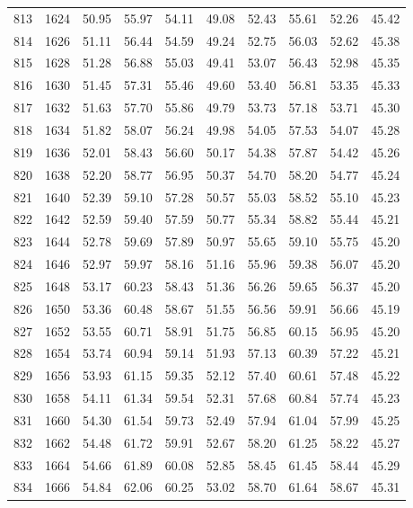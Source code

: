 \begin{longtable}{rrllllllll}
		813 & 1624 & 50.95 & 55.97 & 54.11 & 49.08 & 52.43 & 55.61 & 52.26 & 45.42 \\ 
		814 & 1626 & 51.11 & 56.44 & 54.59 & 49.24 & 52.75 & 56.03 & 52.62 & 45.38 \\ 
		815 & 1628 & 51.28 & 56.88 & 55.03 & 49.41 & 53.07 & 56.43 & 52.98 & 45.35 \\ 
		816 & 1630 & 51.45 & 57.31 & 55.46 & 49.60 & 53.40 & 56.81 & 53.35 & 45.33 \\ 
		817 & 1632 & 51.63 & 57.70 & 55.86 & 49.79 & 53.73 & 57.18 & 53.71 & 45.30 \\ 
		818 & 1634 & 51.82 & 58.07 & 56.24 & 49.98 & 54.05 & 57.53 & 54.07 & 45.28 \\ 
		819 & 1636 & 52.01 & 58.43 & 56.60 & 50.17 & 54.38 & 57.87 & 54.42 & 45.26 \\ 
		820 & 1638 & 52.20 & 58.77 & 56.95 & 50.37 & 54.70 & 58.20 & 54.77 & 45.24 \\ 
		821 & 1640 & 52.39 & 59.10 & 57.28 & 50.57 & 55.03 & 58.52 & 55.10 & 45.23 \\ 
		822 & 1642 & 52.59 & 59.40 & 57.59 & 50.77 & 55.34 & 58.82 & 55.44 & 45.21 \\ 
		823 & 1644 & 52.78 & 59.69 & 57.89 & 50.97 & 55.65 & 59.10 & 55.75 & 45.20 \\ 
		824 & 1646 & 52.97 & 59.97 & 58.16 & 51.16 & 55.96 & 59.38 & 56.07 & 45.20 \\ 
		825 & 1648 & 53.17 & 60.23 & 58.43 & 51.36 & 56.26 & 59.65 & 56.37 & 45.20 \\ 
		826 & 1650 & 53.36 & 60.48 & 58.67 & 51.55 & 56.56 & 59.91 & 56.66 & 45.19 \\ 
		827 & 1652 & 53.55 & 60.71 & 58.91 & 51.75 & 56.85 & 60.15 & 56.95 & 45.20 \\ 
		828 & 1654 & 53.74 & 60.94 & 59.14 & 51.93 & 57.13 & 60.39 & 57.22 & 45.21 \\ 
		829 & 1656 & 53.93 & 61.15 & 59.35 & 52.12 & 57.40 & 60.61 & 57.48 & 45.22 \\ 
		830 & 1658 & 54.11 & 61.34 & 59.54 & 52.31 & 57.68 & 60.84 & 57.74 & 45.23 \\ 
		831 & 1660 & 54.30 & 61.54 & 59.73 & 52.49 & 57.94 & 61.04 & 57.99 & 45.25 \\ 
		832 & 1662 & 54.48 & 61.72 & 59.91 & 52.67 & 58.20 & 61.25 & 58.22 & 45.27 \\ 
		833 & 1664 & 54.66 & 61.89 & 60.08 & 52.85 & 58.45 & 61.45 & 58.44 & 45.29 \\ 
		834 & 1666 & 54.84 & 62.06 & 60.25 & 53.02 & 58.70 & 61.64 & 58.67 & 45.31 \\ 

\end{longtable}
